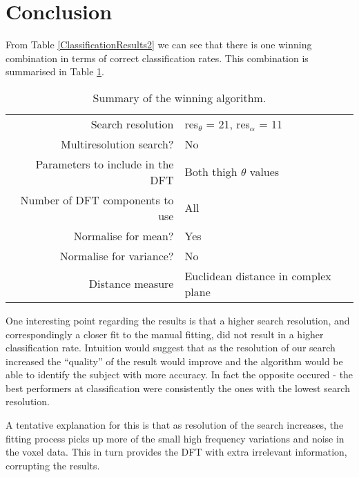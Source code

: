 \section{Conclusion}

From Table \ref{ClassificationResults2} we can see that there is one winning combination in terms of correct classification rates.
This combination is summarised in Table \ref{ConclusionTable}.

\begin{table}[hb]
	\centering
	\begin{tabular}{r|l}
		Search resolution & res$_\theta$ = 21, res$_\alpha$ = 11 \\
		Multiresolution search? & No \\
		Parameters to include in the DFT & Both thigh $\theta$ values \\
		Number of DFT components to use & All \\
		Normalise for mean? & Yes \\
		Normalise for variance? & No \\
		Distance measure & Euclidean distance in complex plane
	\end{tabular}
	\caption{Summary of the winning algorithm.}
	\label{ConclusionTable}
\end{table}

One interesting point regarding the results is that a higher search resolution, and correspondingly a closer fit to the manual fitting, did not result in a higher classification rate.
Intuition would suggest that as the resolution of our search increased the ``quality'' of the result would improve and the algorithm would be able to identify the subject with more accuracy.
In fact the opposite occured - the best performers at classification were consistently the ones with the lowest search resolution.

A tentative explanation for this is that as resolution of the search increases, the fitting process picks up more of the small high frequency variations and noise in the voxel data.
This in turn provides the DFT with extra irrelevant information, corrupting the results.
